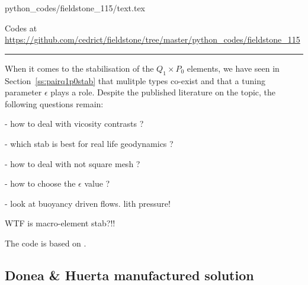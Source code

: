 \begin{flushright} {\tiny {\color{gray} python\_codes/fieldstone\_115/text.tex}} \end{flushright}



\begin{center}
Codes at \url{https://github.com/cedrict/fieldstone/tree/master/python_codes/fieldstone_115}
\end{center}

\par\noindent\rule{\textwidth}{0.4pt}




When it comes to the stabilisation of the $Q_1\times P_0$ elements, 
we have seen in Section~\ref{ss:pairq1p0stab} that mulitple types co-exist
and that a tuning parameter $\epsilon$ plays a role. 
Despite the published literature on the topic, the following questions remain:

- how to deal with vicosity contrasts ? 

- which stab is best for real life geodynamics ? 

- how to deal with not square mesh ?

- how to choose the $\epsilon$ value ?

- look at buoyancy driven flows. lith pressure!

WTF is macro-element stab?!!

The code is based on .


\subsection*{Donea \& Huerta manufactured solution}


